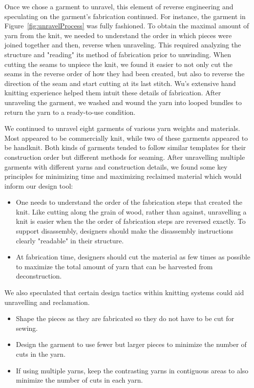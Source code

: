 Once we chose a garment to unravel, this element of reverse engineering and speculating on the garment's fabrication continued. For instance, the garment in Figure~\ref{fig:unravelProcess} was fully fashioned. To obtain the maximal amount of yarn from the knit, we needed to understand the order in which pieces were joined together and then, reverse when unraveling. This required analyzing the structure and "reading" its method of fabrication prior to unwinding. When cutting the seams to unpiece the knit, we found it easier to not only cut the seams in the reverse order of how they had been created, but also to reverse the direction of the seam and start cutting at its last stitch. Wu's extensive hand knitting experience helped them intuit these details of fabrication. After unraveling the garment, we washed and wound the yarn into looped bundles to return the yarn to a ready-to-use condition.

We continued to unravel eight garments of various yarn weights and materials. Most appeared to be commercially knit, while two of these garments appeared to be handknit. Both kinds of garments tended to follow similar templates for their construction order but different methods for seaming. %
After unravelling multiple garments with different yarns and construction details, we found some key principles for minimizing time and maximizing reclaimed material which would inform our design tool: 

\begin{itemize}
    \item One needs to understand the order of the fabrication steps that created the knit. Like cutting along the grain of wood, rather than against, unravelling a knit is easier when the the order of fabrication steps are reversed exactly. To support disassembly, designers should make the disassembly instructions clearly "readable" in their structure.
    \item At fabrication time, designers should cut the material as few times as possible to maximize the total amount of yarn that can be harvested from deconstruction.
\end{itemize}

We also speculated that certain design tactics within knitting systems could aid unravelling and reclamation.
\begin{itemize}
    \item Shape the pieces as they are fabricated so they do not have to be cut for sewing.
    \item Design the garment to use fewer but larger pieces to minimize the number of cuts in the yarn.
    \item If using multiple yarns, keep the contrasting yarns in contiguous areas to also minimize the number of cuts in each yarn.
\end{itemize}

